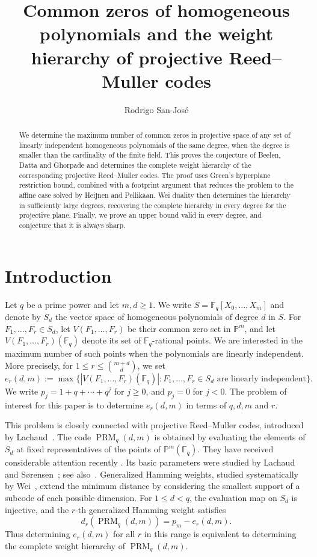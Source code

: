 \documentclass[11pt]{amsart}
\title[Common zeros of homogeneous polynomials]
{Common zeros of homogeneous polynomials and the weight hierarchy of projective Reed--Muller codes}
\author{Rodrigo San-Jos\'e}
\date{}
\theoremstyle{definition}
\newcommand{\F}{\mathbb F}
\newcommand{\PP}{\mathbb P}
\newcommand{\PRM}{\operatorname{PRM}}
\newcommand{\card}[1]{\left|#1\right|}
\numberwithin{equation}{section}
\begin{document}
\begin{abstract}
We determine the maximum number of common zeros in
projective space of any set of linearly independent
homogeneous polynomials of the same degree, when the degree is
smaller than the cardinality of the finite field. This proves the
conjecture of Beelen, Datta and Ghorpade and determines the complete
weight hierarchy of the corresponding projective Reed--Muller
codes. The proof uses Green's hyperplane restriction bound,
combined with a footprint argument that reduces the problem
to the affine case solved by Heijnen and Pellikaan.
Wei duality then determines the hierarchy
in sufficiently large degrees, recovering the complete hierarchy
in every degree for the projective plane.
Finally, we prove an upper bound valid in every degree, and conjecture that it
is always sharp.
\end{abstract}
\maketitle

\section{Introduction}\label{sec:intro}
Let $q$ be a prime power and let $m,d\ge1$. We write
$S=\F_q[X_0,\ldots,X_m]$ and denote by $S_d$ the vector space
of homogeneous polynomials of degree $d$ in $S$. For
$F_1,\ldots,F_r\in S_d$, let $V(F_1,\ldots,F_r)$ be their
common zero set in $\PP^m$, and let
$V(F_1,\ldots,F_r)(\F_q)$ denote its set of $\F_q$-rational
points. We are interested in the maximum number of such points
when the polynomials are linearly independent. More precisely, for
$1\le r\le\binom{m+d}{d}$, we set
\[
 e_r(d,m):=\max\big\{\card{V(F_1,\ldots,F_r)(\F_q)}:
 F_1,\ldots,F_r\in S_d\text{ are linearly independent}\big\}.
\]
We write $p_j=1+q+\cdots+q^j$ for $j\ge0$, and $p_j=0$ for $j<0$.
The problem of interest for this paper is to determine $e_r(d,m)$ in terms of
$q,d,m$ and $r$.

This problem is closely connected with projective Reed--Muller
codes, introduced by Lachaud~\cite{Lachaud}. The code
$\PRM_q(d,m)$ is obtained by evaluating the elements of $S_d$
at fixed representatives of the points of $\PP^m(\F_q)$. They have received considerable attention recently \cite{sanjose_decoding_PRM,sanjoseHullsPRM,sanjoseHullvariationPRM,sanjoseSSCPRM,KaplanKim2025,SongYue2026,SongLuo2026}.
Its basic parameters were studied by Lachaud~\cite{Lachaud1990}
and S{\o}rensen~\cite{Sorensen}; see also~\cite{GL24}.
Generalized Hamming weights, studied systematically by
Wei~\cite{Wei}, extend the minimum distance by considering the
smallest support of a subcode of each possible dimension.
For $1\le d<q$, the evaluation map on $S_d$ is injective, and
the $r$-th generalized Hamming weight satisfies
\begin{equation}\label{eq:weightszeros}
 d_r(\PRM_q(d,m))=p_m-e_r(d,m).
\end{equation}
Thus determining $e_r(d,m)$ for all $r$ in this range is
equivalent to determining the complete weight hierarchy of
$\PRM_q(d,m)$.
\end{document}
